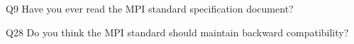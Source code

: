 \begin{description}%
\item{Q9} Have you ever read the MPI standard specification document?%
\item{Q28} Do you think the MPI standard should maintain backward compatibility?%
\end{description}%
